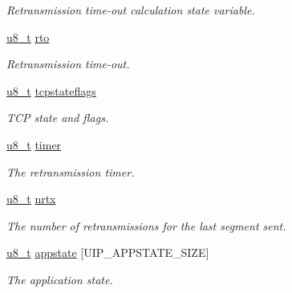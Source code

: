 \begin{CompactItemize}
\begin{CompactList}\small\item\em Retransmission time-out calculation state variable. \item\end{CompactList}\item 
\hypertarget{a00028_e3aa9cc25e45b663e6aabc54c013019e}{
\hyperlink{a00070_ge081489b4906f65a3cb18e9fbe9f8d23}{u8\_\-t} \hyperlink{a00028_e3aa9cc25e45b663e6aabc54c013019e}{rto}}
\label{a00028_e3aa9cc25e45b663e6aabc54c013019e}

\begin{CompactList}\small\item\em Retransmission time-out. \item\end{CompactList}\item 
\hypertarget{a00028_a5f58074435cdc180f17de69651beebd}{
\hyperlink{a00070_ge081489b4906f65a3cb18e9fbe9f8d23}{u8\_\-t} \hyperlink{a00028_a5f58074435cdc180f17de69651beebd}{tcpstateflags}}
\label{a00028_a5f58074435cdc180f17de69651beebd}

\begin{CompactList}\small\item\em TCP state and flags. \item\end{CompactList}\item 
\hypertarget{a00028_2d9732cf5752d30bd11cb25dc7d0c8d3}{
\hyperlink{a00070_ge081489b4906f65a3cb18e9fbe9f8d23}{u8\_\-t} \hyperlink{a00028_2d9732cf5752d30bd11cb25dc7d0c8d3}{timer}}
\label{a00028_2d9732cf5752d30bd11cb25dc7d0c8d3}

\begin{CompactList}\small\item\em The retransmission timer. \item\end{CompactList}\item 
\hypertarget{a00028_4289c59840b128f2f6526e9da2711d47}{
\hyperlink{a00070_ge081489b4906f65a3cb18e9fbe9f8d23}{u8\_\-t} \hyperlink{a00028_4289c59840b128f2f6526e9da2711d47}{nrtx}}
\label{a00028_4289c59840b128f2f6526e9da2711d47}

\begin{CompactList}\small\item\em The number of retransmissions for the last segment sent. \item\end{CompactList}\item 
\hypertarget{a00028_50ffde797bf4549b3f968e2571e81e62}{
\hyperlink{a00070_ge081489b4906f65a3cb18e9fbe9f8d23}{u8\_\-t} \hyperlink{a00028_50ffde797bf4549b3f968e2571e81e62}{appstate} \mbox{[}UIP\_\-APPSTATE\_\-SIZE\mbox{]}}
\label{a00028_50ffde797bf4549b3f968e2571e81e62}

\begin{CompactList}\small\item\em The application state. \item\end{CompactList}\end{CompactItemize}
